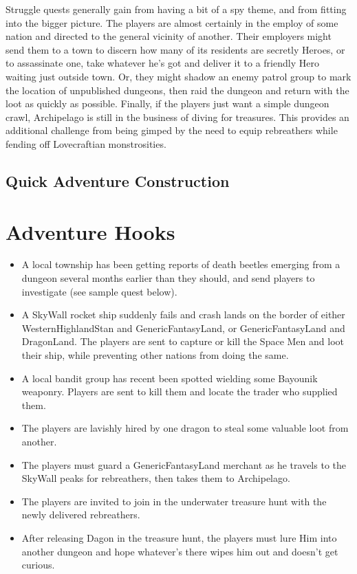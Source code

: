 \documentclass[12pt,a4paper,twocolumn]{article}
\begin{document}
\begin{itemize}
Struggle quests generally gain from having a bit of a spy theme, and from fitting into the bigger picture.  The players are almost certainly in the employ of some nation and directed to the general vicinity of another.  Their employers might send them to a town to discern how many of its residents are secretly Heroes, or to assassinate one, take whatever he's got and deliver it to a friendly Hero waiting just outside town.  Or, they might shadow an enemy patrol group to mark the location of unpublished dungeons, then raid the dungeon and return with the loot as quickly as possible.  Finally, if the players just want a simple dungeon crawl, Archipelago is still in the business of diving for treasures.  This provides an additional challenge from being gimped by the need to equip rebreathers while fending off Lovecraftian monstrosities.  

\end{itemize} 

\subsection{Quick Adventure Construction}

\section{Adventure Hooks}

\begin{itemize}

\item A local township has been getting reports of death beetles emerging from a dungeon several months earlier than they should, and send players to investigate (see sample quest below).

\item A SkyWall rocket ship suddenly fails and crash lands on the border of either WesternHighlandStan and GenericFantasyLand, or GenericFantasyLand and DragonLand.  The players are sent to capture or kill the Space Men and loot their ship, while preventing other nations from doing the same.

\item A local bandit group has recent been spotted wielding some Bayounik weaponry.  Players are sent to kill them and locate the trader who supplied them.

\item The players are lavishly hired by one dragon to steal some valuable loot from another.

\item The players must guard a GenericFantasyLand merchant as he travels to the SkyWall peaks for rebreathers, then takes them to Archipelago.

\item The players are invited to join in the underwater treasure hunt with the newly delivered rebreathers.

\item After releasing Dagon in the treasure hunt, the players must lure Him into another dungeon and hope whatever's there wipes him out and doesn't get curious.

\end{itemize}
\end{document}

